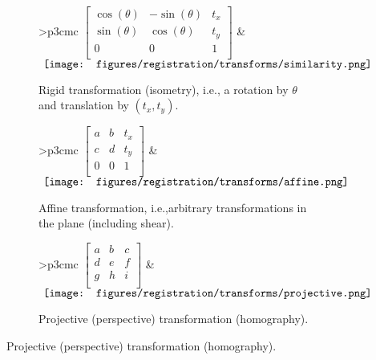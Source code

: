 \begin{figure}[!htbp]
	\begin{subfigure}{\linewidth}
		\centering
		\begin{tabular}{>{\centering}p{3cm}c}
			\(
			\begin{bmatrix}
				\cos(\theta) & -\sin(\theta) & t_x \\
				\sin(\theta) & \cos(\theta)  & t_y \\
				0            & 0             & 1   \\
			\end{bmatrix}
			\)
			 &
			\(
			\vcenter{
				\hbox{
					\texttt{[image: figures/registration/transforms/similarity.png]}
				}
			}
			\)
		\end{tabular}
		\caption{Rigid transformation (isometry), i.e., a rotation by \(\theta\) and translation by \((t_x, t_y)\).} \label{fig:rigidtransformation}
	\end{subfigure}
	\begin{subfigure}{\linewidth}
		\centering
		\begin{tabular}{>{\centering}p{3cm}c}
			\(
			\begin{bmatrix}
				a & b & t_x \\
				c & d & t_y \\
				0 & 0 & 1   \\
			\end{bmatrix}
			\)
			 &
			\(
			\vcenter{
				\hbox{
					\texttt{[image: figures/registration/transforms/affine.png]}
				}
			}
			\)
		\end{tabular}
		\caption{Affine transformation, i.e.,arbitrary transformations in the plane (including shear).} \label{fig:affinetransformation}
	\end{subfigure}
	\begin{subfigure}{\linewidth}
		\centering
		\begin{tabular}{>{\centering}p{3cm}c}
			\(
			\begin{bmatrix}
				a & b & c \\
				d & e & f \\
				g & h & i \\
			\end{bmatrix}
			\)
			 &
			\(
			\vcenter{
				\hbox{
					\texttt{[image: figures/registration/transforms/projective.png]}
				}
			}
			\)
		\end{tabular}
		\caption{Projective (perspective) transformation (homography).} \label{fig:projectivetransformation}

\end{subfigure}
\end{figure}
